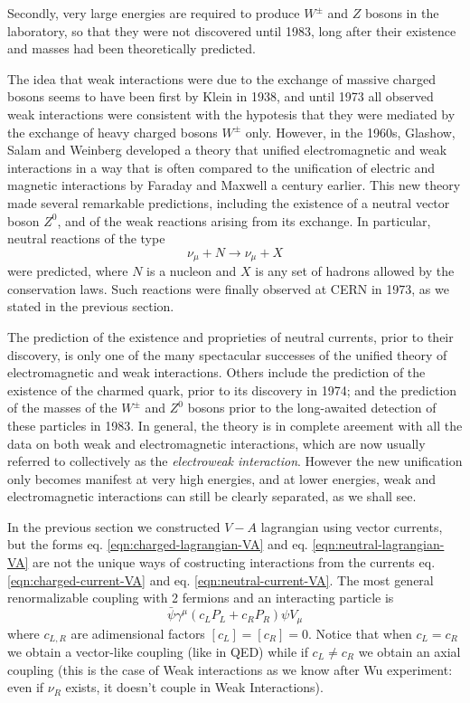 \documentclass[TheoreticalPhy_ModB.tex]{subfiles}
\begin{document}
Secondly, very large energies are required to produce $W^\pm$ and $Z$ bosons in the laboratory, so that they were not discovered until 1983, long after their existence and masses had been theoretically predicted. 

The idea that weak interactions were due to the exchange of massive charged bosons seems to have been first by Klein in 1938, and until 1973 all observed weak interactions were consistent with the hypotesis that they were mediated by the exchange of heavy charged bosons $W^\pm$ only. However, in the 1960s, Glashow, Salam and Weinberg developed a theory that unified electromagnetic and weak interactions in a way that is often compared to the unification of electric and magnetic interactions by Faraday and Maxwell a century earlier. This new theory made several remarkable predictions, including the existence of a neutral vector boson $Z^0$, and of the weak reactions arising from its exchange. In particular, neutral reactions of the type
\[\nu_\mu+N\to\nu_\mu+X\]
were predicted, where $N$ is a nucleon and $X$ is any set of hadrons allowed by the conservation laws. Such reactions were finally observed at CERN in 1973, as we stated in the previous section.

The prediction of the existence and proprieties of neutral currents, prior to their discovery, is only one of the many spectacular successes of the unified theory of electromagnetic and weak interactions. Others include the prediction of the existence of the charmed quark, prior to its discovery in 1974; and the prediction of the masses of the $W^\pm$ and $Z^0$ bosons prior to the long-awaited detection of these particles in 1983. In general, the theory is in complete areement with all the data on both weak and electromagnetic interactions, which are now usually referred to collectively as the \emph{electroweak interaction}. However the new unification only becomes manifest at very high energies, and at lower energies, weak and electromagnetic interactions can still be clearly separated, as we shall see.

In the previous section we constructed $V-A$ lagrangian using vector currents, but the forms eq. \eqref{eqn:charged-lagrangian-VA} and eq. \eqref{eqn:neutral-lagrangian-VA} are not the unique ways of costructing interactions from the currents eq. \eqref{eqn:charged-current-VA} and eq. \eqref{eqn:neutral-current-VA}. The most general renormalizable coupling with 2 fermions and an interacting particle is
\[\bar\psi\gamma^\mu(c_LP_L+c_RP_R)\psi V_\mu\]
where $c_{L,R}$ are adimensional factors $[c_L]=[c_R]=0$. Notice that when $c_L=c_R$ we obtain a vector-like coupling (like in QED) while if $c_L\neq c_R$ we obtain an axial coupling (this is the case of Weak interactions as we know after Wu experiment: even if $\nu_R$ exists, it doesn't couple in Weak Interactions).
\end{document}
